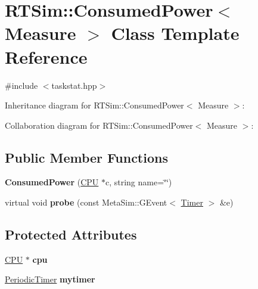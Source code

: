 \hypertarget{classRTSim_1_1ConsumedPower}{}\section{R\+T\+Sim\+:\+:Consumed\+Power$<$ Measure $>$ Class Template Reference}
\label{classRTSim_1_1ConsumedPower}


{\ttfamily \#include $<$taskstat.\+hpp$>$}



Inheritance diagram for R\+T\+Sim\+:\+:Consumed\+Power$<$ Measure $>$\+:


Collaboration diagram for R\+T\+Sim\+:\+:Consumed\+Power$<$ Measure $>$\+:
\subsection*{Public Member Functions}
\begin{DoxyCompactItemize}
\item 
{\bfseries Consumed\+Power} (\hyperlink{classRTSim_1_1CPU}{C\+PU} $\ast$c, string name=\char`\"{}\char`\"{})\hypertarget{classRTSim_1_1ConsumedPower_a46183f46933f30400b5900f781223c61}{}\label{classRTSim_1_1ConsumedPower_a46183f46933f30400b5900f781223c61}

\item 
virtual void {\bfseries probe} (const Meta\+Sim\+::\+G\+Event$<$ \hyperlink{classRTSim_1_1Timer}{Timer} $>$ \&e)\hypertarget{classRTSim_1_1ConsumedPower_ae1cb276971c4bae9bc94a1d4126f021f}{}\label{classRTSim_1_1ConsumedPower_ae1cb276971c4bae9bc94a1d4126f021f}

\end{DoxyCompactItemize}
\subsection*{Protected Attributes}
\begin{DoxyCompactItemize}
\item 
\hyperlink{classRTSim_1_1CPU}{C\+PU} $\ast$ {\bfseries cpu}\hypertarget{classRTSim_1_1ConsumedPower_a7663ba56d03edef5ad72910e4e146e88}{}\label{classRTSim_1_1ConsumedPower_a7663ba56d03edef5ad72910e4e146e88}

\item 
\hyperlink{classRTSim_1_1PeriodicTimer}{Periodic\+Timer} {\bfseries mytimer}\hypertarget{classRTSim_1_1ConsumedPower_ada09e435c920749a04287be8c95a6b1c}{}\label{classRTSim_1_1ConsumedPower_ada09e435c920749a04287be8c95a6b1c}

\end{DoxyCompactItemize}


